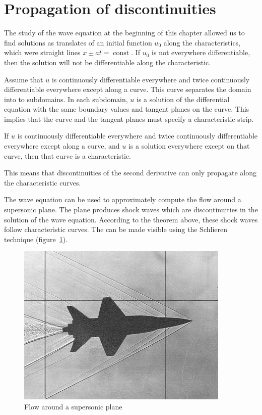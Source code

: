 %
%
%
\section{Propagation of discontinuities}
The study of the wave equation at the beginning of this chapter
allowed us to find solutions as translates of an initial function
$u_0$ along the characteristics, which were straight lines
$x\pm at=\operatorname{const}$.
If $u_0$ is not everywhere differentiable, then the solution will
not be differentiable along the characteristic.

Assume that $u$ is continuously differentiable everywhere
and twice continuously differentiable everywhere
except along a curve.
This curve separates the domain into to subdomains.
In each subdomain, $u$ is a solution of the differential equation
with the same boundary values and tangent planes on the curve.
This implies that the curve and the tangent planes must
specify a characteristic strip.

\begin{satz}
If $u$ is continuously differentiable everywhere and twice
continuously differentiable everywhere except along a curve,
and $u$ is a solution everywhere except on that curve,
then that curve is a characteristic.
\end{satz}

This means that discontinuities of the second derivative
can only propagate along the characteristic curves.

The wave equation can be used to approximately compute the
flow around a supersonic plane.
The plane produces shock waves which are discontinuities in the
solution of the wave equation.
According to the theorem above, these shock waves follow
characteristic curves.
The can be made visible using the Schlieren technique
(figure~\ref{ueberschall2d}).

\begin{figure}
\begin{center}
\includegraphics[width=0.8\hsize]{../common/graphics/i-5-1}
\end{center}
\caption{Flow around a supersonic plane\label{ueberschall2d}}
\end{figure}

